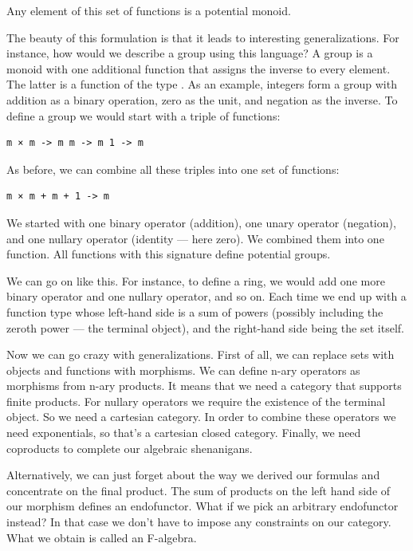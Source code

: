 Any element of this set of functions is a potential monoid.

The beauty of this formulation is that it leads to interesting
generalizations. For instance, how would we describe a group using this
language? A group is a monoid with one additional function that assigns
the inverse to every element. The latter is a function of the type
. As an example, integers form a group with
addition as a binary operation, zero as the unit, and negation as the
inverse. To define a group we would start with a triple of functions:

\begin{verbatim}
m × m -> m m -> m 1 -> m
\end{verbatim}

As before, we can combine all these triples into one set of functions:

\begin{verbatim}
m × m + m + 1 -> m
\end{verbatim}

We started with one binary operator (addition), one unary operator
(negation), and one nullary operator (identity --- here zero). We
combined them into one function. All functions with this signature
define potential groups.

We can go on like this. For instance, to define a ring, we would add one
more binary operator and one nullary operator, and so on. Each time we
end up with a function type whose left-hand side is a sum of powers
(possibly including the zeroth power --- the terminal object), and the
right-hand side being the set itself.

Now we can go crazy with generalizations. First of all, we can replace
sets with objects and functions with morphisms. We can define n-ary
operators as morphisms from n-ary products. It means that we need a
category that supports finite products. For nullary operators we require
the existence of the terminal object. So we need a cartesian category.
In order to combine these operators we need exponentials, so that's a
cartesian closed category. Finally, we need coproducts to complete our
algebraic shenanigans.

Alternatively, we can just forget about the way we derived our formulas
and concentrate on the final product. The sum of products on the left
hand side of our morphism defines an endofunctor. What if we pick an
arbitrary endofunctor  instead? In that case we don't have to
impose any constraints on our category. What we obtain is called an
F-algebra.

